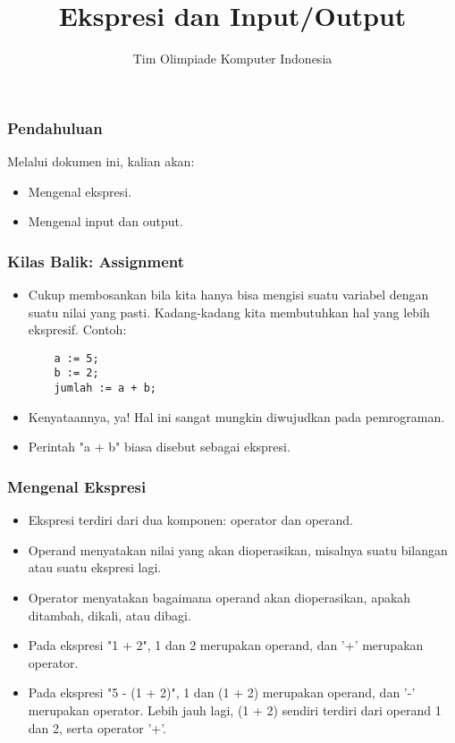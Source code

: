 \documentclass{beamer}
\title{Ekspresi dan Input/Output}
\author{Tim Olimpiade Komputer Indonesia}
\begin{document}
\begin{frame}
\titlepage
\end{frame}

\begin{frame}
\frametitle{Pendahuluan}
Melalui dokumen ini, kalian akan:
\begin{itemize}
	\item Mengenal ekspresi.
	\item Mengenal input dan output.
\end{itemize}
\end{frame}

\begin{frame}[fragile]
\frametitle{Kilas Balik: Assignment}
\begin{itemize}
	\item Cukup membosankan bila kita hanya bisa mengisi suatu variabel dengan suatu nilai yang pasti. Kadang-kadang kita membutuhkan hal yang lebih ekspresif. Contoh:
	\begin{lstlisting}
	a := 5;
	b := 2;
	jumlah := a + b;
	\end{lstlisting}
	\item Kenyataannya, ya! Hal ini sangat mungkin diwujudkan pada pemrograman.
	\item Perintah "a + b" biasa disebut sebagai ekspresi.
\end{itemize}
\end{frame}

\begin{frame}
\frametitle{Mengenal Ekspresi}
\begin{itemize}
	\item Ekspresi terdiri dari dua komponen: \alert{operator} dan \alert{operand}.
	\item Operand menyatakan nilai yang akan dioperasikan, misalnya suatu bilangan atau suatu ekspresi lagi.
	\item Operator menyatakan bagaimana operand akan dioperasikan, apakah ditambah, dikali, atau dibagi.
	\item Pada ekspresi "1 + 2", 1 dan 2 merupakan operand, dan '+' merupakan operator.
	\item Pada ekspresi "5 - (1 + 2)", 1 dan (1 + 2) merupakan operand, dan '-' merupakan operator. Lebih jauh lagi, (1 + 2) sendiri terdiri dari operand 1 dan 2, serta operator '+'.
\end{itemize}
\end{frame}
\end{document}

